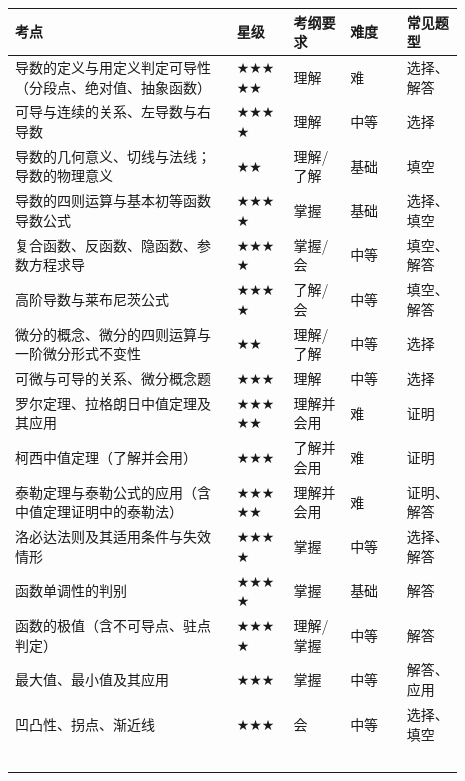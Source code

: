 \documentclass[11pt,openany,UTF8]{ctexbook}
\begin{document}
\begingroup\small\setlength{\tabcolsep}{4.0pt}
\begin{longtable}{@{}L{0.4327\linewidth}L{0.1154\linewidth}L{0.1154\linewidth}L{0.1154\linewidth}L{0.1154\linewidth}@{}}
\toprule
\textbf{考点} & \textbf{星级} & \textbf{考纲要求} & \textbf{难度} & \textbf{常见题型} \\
\midrule
\endhead
导数的定义与用定义判定可导性（分段点、绝对值、抽象函数） & $\bigstar$$\bigstar$$\bigstar$$\bigstar$$\bigstar$ & 理解 & 难 & 选择、解答 \\
可导与连续的关系、左导数与右导数 & $\bigstar$$\bigstar$$\bigstar$$\bigstar$ & 理解 & 中等 & 选择 \\
导数的几何意义、切线与法线；导数的物理意义 & $\bigstar$$\bigstar$ & 理解/了解 & 基础 & 填空 \\
导数的四则运算与基本初等函数导数公式 & $\bigstar$$\bigstar$$\bigstar$$\bigstar$ & 掌握 & 基础 & 选择、填空 \\
复合函数、反函数、隐函数、参数方程求导 & $\bigstar$$\bigstar$$\bigstar$$\bigstar$ & 掌握/会 & 中等 & 填空、解答 \\
高阶导数与莱布尼茨公式 & $\bigstar$$\bigstar$$\bigstar$$\bigstar$ & 了解/会 & 中等 & 填空、解答 \\
微分的概念、微分的四则运算与一阶微分形式不变性 & $\bigstar$$\bigstar$ & 理解/了解 & 中等 & 选择 \\
可微与可导的关系、微分概念题 & $\bigstar$$\bigstar$$\bigstar$ & 理解 & 中等 & 选择 \\
罗尔定理、拉格朗日中值定理及其应用 & $\bigstar$$\bigstar$$\bigstar$$\bigstar$$\bigstar$ & 理解并会用 & 难 & 证明 \\
柯西中值定理（了解并会用） & $\bigstar$$\bigstar$$\bigstar$ & 了解并会用 & 难 & 证明 \\
泰勒定理与泰勒公式的应用（含中值定理证明中的泰勒法） & $\bigstar$$\bigstar$$\bigstar$$\bigstar$$\bigstar$ & 理解并会用 & 难 & 证明、解答 \\
洛必达法则及其适用条件与失效情形 & $\bigstar$$\bigstar$$\bigstar$$\bigstar$ & 掌握 & 中等 & 选择、解答 \\
函数单调性的判别 & $\bigstar$$\bigstar$$\bigstar$$\bigstar$ & 掌握 & 基础 & 解答 \\
函数的极值（含不可导点、驻点判定） & $\bigstar$$\bigstar$$\bigstar$$\bigstar$ & 理解/掌握 & 中等 & 解答 \\
最大值、最小值及其应用 & $\bigstar$$\bigstar$$\bigstar$ & 掌握 & 中等 & 解答、应用 \\
凹凸性、拐点、渐近线 & $\bigstar$$\bigstar$$\bigstar$ & 会 & 中等 & 选择、填空 \\
$$
\end{longtable}
\end{document}
